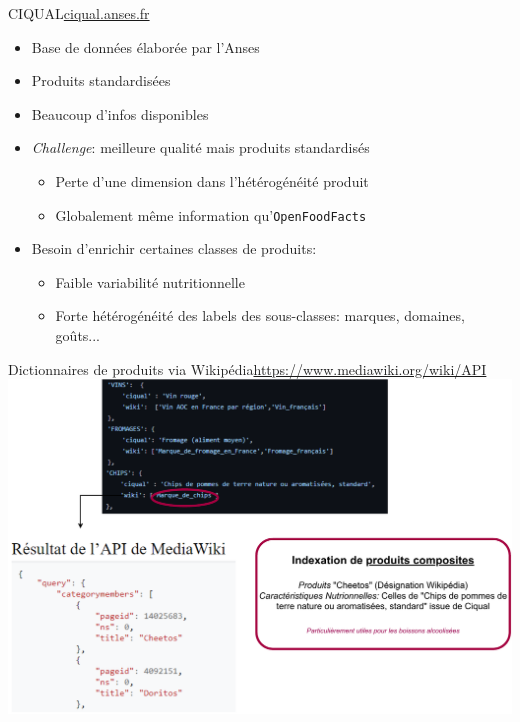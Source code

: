 \documentclass[ignorenonframetext,]{beamer}
\begin{document}
\begin{frame}{CIQUAL}{\href{https://ciqual.anses.fr/}{ciqual.anses.fr}}

\begin{itemize}
    \item Base de données élaborée par l'Anses
    \item Produits standardisées
    \item Beaucoup d'infos disponibles
    \item \textit{Challenge}:  meilleure qualité mais produits standardisés
\begin{itemize}
    \item Perte d'une dimension dans l'hétérogénéité produit
    \item Globalement même information qu'\texttt{OpenFoodFacts}
\end{itemize}
    \item Besoin d'enrichir certaines classes de produits:
\begin{itemize}
    \item Faible variabilité nutritionnelle
    \item Forte hétérogénéité des labels des sous-classes: marques, domaines, goûts...
\end{itemize}
    
\end{itemize}
\end{frame}
\begin{frame}{Dictionnaires de produits via Wikipédia}{\href{https://www.mediawiki.org/wiki/API}{https://www.mediawiki.org/wiki/API}}
    \includegraphics[width = \linewidth]{images/wikipedia.pdf}
    
\end{frame}
\end{document}
